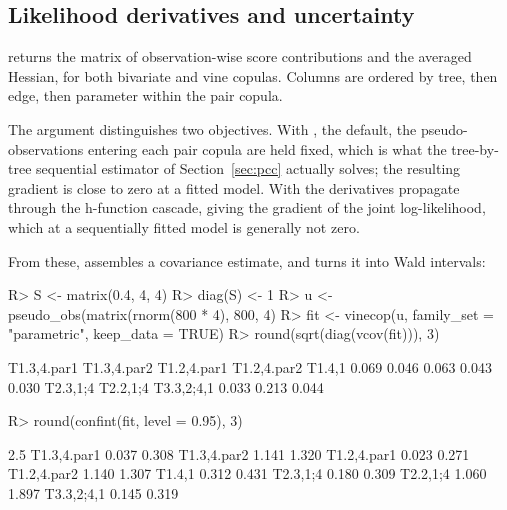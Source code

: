 \documentclass[article]{jss}
\begin{document}
\subsection{Likelihood derivatives and uncertainty}\label{sec:deriv-usage}

 returns the matrix of observation-wise score contributions and
 the averaged Hessian, for both bivariate and vine copulas.
Columns are ordered by tree, then edge, then parameter within the pair copula.

The  argument distinguishes two objectives.  With
, the default, the pseudo-observations entering each
pair copula are held fixed, which is what the tree-by-tree sequential estimator
of Section~\ref{sec:pcc} actually solves; the resulting gradient is close to
zero at a fitted model.  With  the
derivatives propagate through the h-function cascade, giving the gradient of
the joint log-likelihood, which at a sequentially fitted model is generally not
zero.

From these,  assembles a covariance estimate, and
 turns it into Wald intervals:

\begin{CodeChunk}
\begin{CodeInput}
R> S <- matrix(0.4, 4, 4)
R> diag(S) <- 1
R> u <- pseudo_obs(matrix(rnorm(800 * 4), 800, 4) %
R> fit <- vinecop(u, family_set = "parametric", keep_data = TRUE)
R> round(sqrt(diag(vcov(fit))), 3)
\end{CodeInput}
\begin{CodeOutput}
T1.3,4.par1 T1.3,4.par2 T1.2,4.par1 T1.2,4.par2      T1.4,1
      0.069       0.046       0.063       0.043       0.030
   T2.3,1;4    T2.2,1;4  T3.3,2;4,1
      0.033       0.213       0.044
\end{CodeOutput}
\begin{CodeInput}
R> round(confint(fit, level = 0.95), 3)
\end{CodeInput}
\begin{CodeOutput}
            2.5 %
T1.3,4.par1 0.037  0.308
T1.3,4.par2 1.141  1.320
T1.2,4.par1 0.023  0.271
T1.2,4.par2 1.140  1.307
T1.4,1      0.312  0.431
T2.3,1;4    0.180  0.309
T2.2,1;4    1.060  1.897
T3.3,2;4,1  0.145  0.319
\end{CodeOutput}
\end{CodeChunk}
\end{document}
